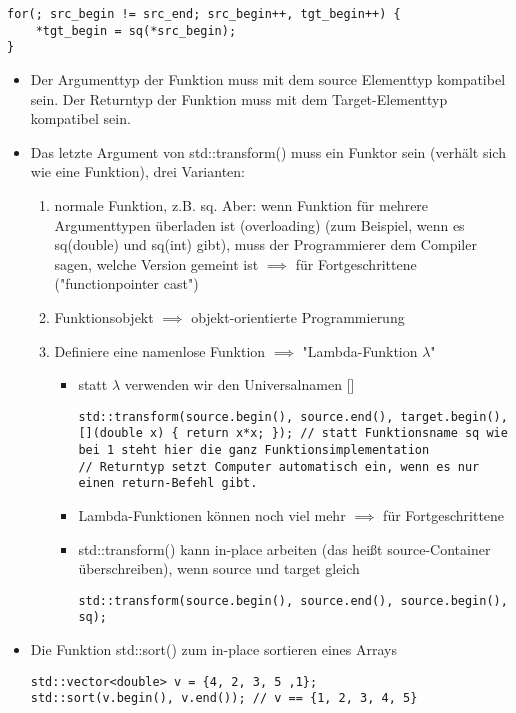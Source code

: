 \documentclass[a4paper]{scrartcl}
\theoremstyle{definition}
\theoremstyle{plain}
\theoremstyle{remark}
\theoremstyle{remark}
\begin{document}
\begin{itemize}
\begin{itemize}
\begin{verbatim}
for(; src_begin != src_end; src_begin++, tgt_begin++) {
	*tgt_begin = sq(*src_begin);
}
\end{verbatim}
\begin{itemize}
\item Der Argumenttyp der Funktion muss mit dem source Elementtyp kompatibel sein. Der Returntyp der Funktion muss mit dem Target-Elementtyp kompatibel sein.
\item Das letzte Argument von std::transform() muss ein Funktor sein (verhält sich wie eine Funktion), drei Varianten:
\begin{enumerate}
\item normale Funktion, z.B. sq. Aber: wenn Funktion für mehrere Argumenttypen überladen ist (overloading) (zum Beispiel, wenn es sq(double) und sq(int) gibt), muss der Programmierer dem Compiler sagen, welche Version gemeint ist $\implies$ für Fortgeschrittene ("functionpointer cast")
\item Funktionsobjekt $\implies$ objekt-orientierte Programmierung
\item Definiere eine namenlose Funktion $\implies$ "Lambda-Funktion $\lambda$"
\begin{itemize}
\item statt $\lambda$ verwenden wir den Universalnamen []
\begin{verbatim}
std::transform(source.begin(), source.end(), target.begin(), [](double x) { return x*x; }); // statt Funktionsname sq wie bei 1 steht hier die ganz Funktionsimplementation
// Returntyp setzt Computer automatisch ein, wenn es nur einen return-Befehl gibt.
\end{verbatim}
\item Lambda-Funktionen können noch viel mehr $\implies$ für Fortgeschrittene
\item std::transform() kann in-place arbeiten (das heißt source-Container überschreiben), wenn source und target gleich
\begin{verbatim}
std::transform(source.begin(), source.end(), source.begin(), sq);
\end{verbatim}
\end{itemize}
\end{enumerate}
\item Die Funktion std::sort() zum in-place sortieren eines Arrays
\begin{verbatim}
std::vector<double> v = {4, 2, 3, 5 ,1};
std::sort(v.begin(), v.end()); // v == {1, 2, 3, 4, 5}
\end{verbatim}

\end{itemize}
\end{itemize}
\end{itemize}
\end{document}
